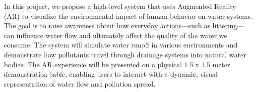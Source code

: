 In this project, we propose a high-level system that uses Augmented Reality (AR) to visualize the environmental impact of human behavior on water systems. The goal is to raise awareness about how everyday actions—such as littering—can influence water flow and ultimately affect the quality of the water we consume. The system will simulate water runoff in various environments and demonstrate how pollutants travel through drainage systems into natural water bodies. The AR experience will be presented on a physical 1.5 x 1.5 meter demonstration table, enabling users to interact with a dynamic, visual representation of water flow and pollution spread.
